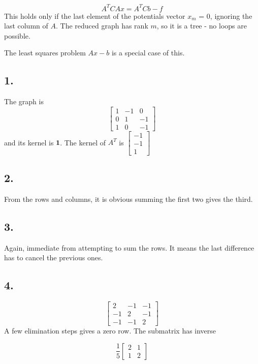 \documentclass[]{article}
\begin{document}
\[
    A^TCAx = A^TCb - f
\] This holds only if the last element of the potentials vector \(x _m\)
= 0, ignoring the last column of \(A\). The reduced graph has rank
\(m\), so it is a tree - no loops are possible.

The least squares problem \(Ax -b\) is a special case of this.

\hypertarget{section}{%
\subsection{1.}\label{section}}

The graph is \[
    \begin{bmatrix}
    1 & -1 & 0\\
    0 & 1 & -1\\
    1 & 0 & -1
    \end{bmatrix}
\] and its kernel is \(\mathbold 1\). The kernel of \(A^T\) is
\(\begin{bmatrix}-1\\-1\\1\end{bmatrix}\)

\hypertarget{section-1}{%
\subsection{2.}\label{section-1}}

From the rows and columns, it is obvious summing the first two gives the
third.

\hypertarget{section-2}{%
\subsection{3.}\label{section-2}}

Again, immediate from attempting to sum the rows. It means the last
difference has to cancel the previous ones.

\hypertarget{section-3}{%
\subsection{4.}\label{section-3}}

\[
\begin{bmatrix}
2 & -1 & -1\\
-1 & 2 & -1\\
-1 & -1 & 2
\end{bmatrix}
\] A few elimination steps gives a zero row. The submatrix has inverse

\[
    \frac {1}{5}\begin{bmatrix}
    2 & 1\\
    1 & 2
    \end{bmatrix}
\]
\end{document}
